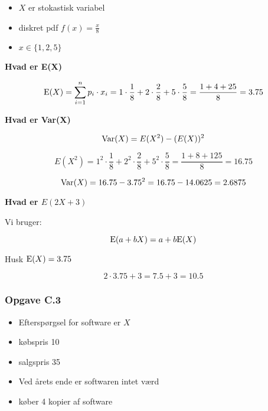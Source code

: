 \begin{itemize}
    \item $X$ er stokastisk variabel
    \item diskret pdf $f(x) = \frac{x}{8}$
    \item $x\in \{1, 2, 5 \}$
\end{itemize}

\textbf{Hvad er E(X)}

\begin{equation}
    \text{E}(X) = \sum_{i=1}^n p_i \cdot x_i = 1\cdot \frac{1}{8} + 2 \cdot \frac{2}{8} + 5 \cdot \frac{5}{8} = \frac{1 + 4 + 25}{8} = 3.75
\end{equation}

\textbf{Hvad er Var(X)}

\begin{equation}
    \text{Var}(X) = E(X^2) - (E(X))^2
\end{equation}

\begin{equation}
    E(X^2) = 1^2 \cdot \frac{1}{8} + 2^2 \cdot \frac{2}{8} + 5^2 \cdot \frac{5}{8} = \frac{1 + 8  + 125}{8} = 16.75
\end{equation}

\begin{equation}
    \text{Var}(X) = 16.75 - 3.75^2 = 16.75 - 14.0625 = 2.6875
\end{equation}

\textbf{Hvad er $E(2X + 3)$}

Vi bruger:

\begin{equation}
    \text{E}(a + bX) = a + b \text{E}(X)
\end{equation}

Husk $\text{E}(X) = 3.75$

\begin{equation}
    2\cdot 3.75 + 3 = 7.5 + 3 = 10.5
\end{equation}

\subsubsection{Opgave C.3}

\begin{itemize}
    \item Efterspørgsel for software er $X$
    \item købspris 10
    \item salgspris 35
    \item Ved årets ende er softwaren intet værd
    \item køber 4 kopier af software
\end{itemize}


